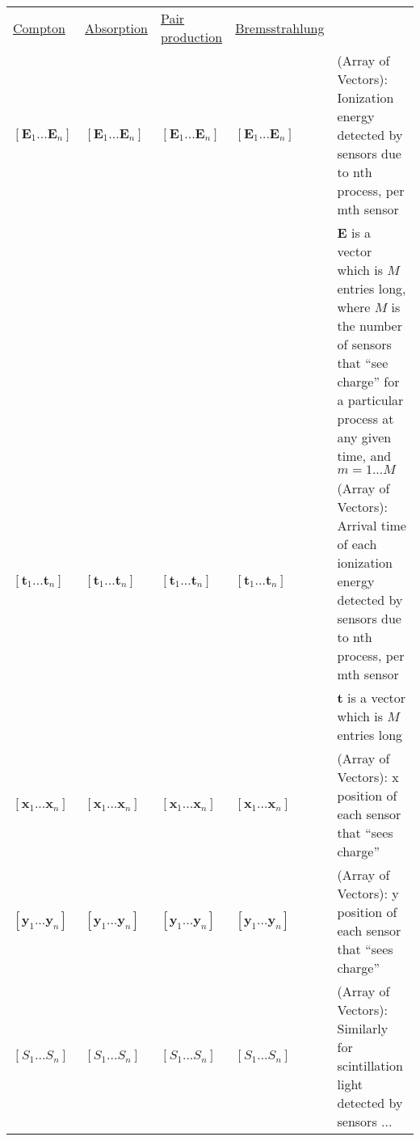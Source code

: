 \documentclass{article}
\begin{document}
\begin{tabular}{|l|l|l|l|l}
    \underline{Compton} & \underline {Absorption} & \underline{Pair production} & \underline{Bremsstrahlung} & \\
    $[\textbf{E}_{1}...\textbf{E}_{n}]$ & $[\textbf{E}_{1}...\textbf{E}_{n}]$ & $[\textbf{E}_{1}...\textbf{E}_{n}]$ & $[\textbf{E}_{1}...\textbf{E}_{n}]$ & (Array of Vectors): Ionization energy detected by sensors due to nth process, per mth sensor \\ & & & &  $\textbf{E}$ is a vector which is $M$ entries long, where $M$ is the number of sensors that ``see charge'' for a particular process at any given time, and  $m=1...M$\\
    $[\textbf{t}_{1}...\textbf{t}_{n}]$ & $[\textbf{t}_{1}...\textbf{t}_{n}]$ & $[\textbf{t}_{1}...\textbf{t}_{n}]$ & $[\textbf{t}_{1}...\textbf{t}_{n}]$ & (Array of Vectors): Arrival time of each ionization energy detected by sensors due to nth process, per mth sensor \\ & & & &  $\textbf{t}$ is a vector which is $M$ entries long\\
    $[\textbf{x}_{1}...\textbf{x}_{n}]$ & $[\textbf{x}_{1}...\textbf{x}_{n}]$ & $[\textbf{x}_{1}...\textbf{x}_{n}]$ & $[\textbf{x}_{1}...\textbf{x}_{n}]$ & (Array of Vectors): x position of each sensor that ``sees charge''\\
    $[\textbf{y}_{1}...\textbf{y}_{n}]$ & $[\textbf{y}_{1}...\textbf{y}_{n}]$  & $[\textbf{y}_{1}...\textbf{y}_{n}]$  & $[\textbf{y}_{1}...\textbf{y}_{n}]$  & (Array of Vectors): y position of each sensor that ``sees charge''\\
    $[S_{1}...S_{n}]$ & $[S_{1}...S_{n}]$ & $[S_{1}...S_{n}]$ & $[S_{1}...S_{n}]$ & (Array of Vectors): Similarly for scintillation light detected by sensors ... \\
\end{tabular}
\end{document}

